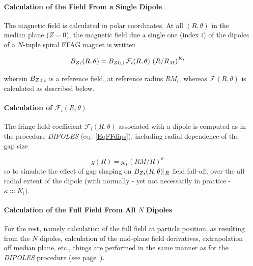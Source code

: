 {\medskip


\paragraph{Calculation of the Field From a Single Dipole} 

 \noindent The magnetic field is calculated in  polar
coordinates.  At all $(R,\theta)$ in the median plane ($Z=0$), the 
magnetic field  due  a single one (index $i$) of the  dipoles  of a $N$-tuple spiral FFAG  magnet is written 

$$ {B_Z}_i(R,\theta) =  {B_Z}_{0,i} \, \mathcal{F}_i(R,\theta) \, \left(   R/R_M \right)^{K_i}  $$

\noindent wherein ${B_Z}_{0,i}$  is a reference field, at reference radius  $RM_{i}$, 
 whereas $ \mathcal{F}(R,\theta)$ is calculated as described below. 



\paragraph{Calculation of $\mathcal{F}_i(R,\theta) $} 

\noindent The fringe field coefficient  $\mathcal{F}_i(R,\theta) $ associated with a  dipole is computed as in the 
procedure  \textsl{DIPOLES} (eq.~\ref{EqFFdips}), including  radial dependence of the gap size 

\begin{equation}
g(R) = g_0 \, (RM/R)^{\kappa}
\end{equation}
%
\noindent  so to simulate the effect of gap shaping on $ {B_Z}_i(R,\theta)|_R$ 
field fall-off,  over the 
all radial extent of the  dipole (with normally - yet not necessarily in practice - $\kappa \approx K_i$). 
 

\medskip

\paragraph{Calculation of the Full Field From All $N$ Dipoles}

For the rest, namely calculation of the full field at particle position, as resulting from the $N$ dipoles,  
  calculation of the  mid-plane field derivatives, 
extrapolation off median plane, etc., things are performed in the same manner  as for the 
 \textsl{DIPOLES} procedure (see page~\pageref{FFatAP}). 





}
